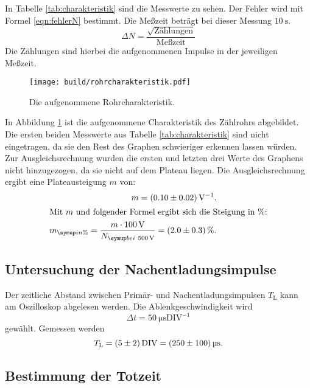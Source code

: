 In Tabelle \ref{tab:charakteristik} sind die Messwerte zu sehen. Der Fehler wird mit Formel
\eqref{eqn:fehlerN} bestimmt. Die Meßzeit beträgt bei dieser Messung $\SI{10}{\second}$.
\begin{equation}
  \Delta N = \frac{\sqrt{\text{Zählungen}}}{\text{Meßzeit}}
  \label{eqn:fehlerN}
\end{equation}
Die Zählungen sind hierbei die aufgenommenen Impulse in der jeweiligen Meßzeit.

\begin{figure}
  \centering
  \texttt{[image: build/rohrcharakteristik.pdf]}
  \caption{Die aufgenommene Rohrcharakteristik.}
  \label{fig:rohrcharakteristik}
\end{figure}

In Abbildung \ref{fig:rohrcharakteristik} ist die aufgenommene Charakteristik des Zählrohrs abgebildet.
Die ersten beiden Messwerte aus Tabelle \ref{tab:charakteristik} sind nicht eingetragen, da sie
den Rest des Graphen schwieriger erkennen lassen würden. Zur Ausgleichsrechnung wurden die ersten und
letzten drei Werte des Graphens nicht hinzugezogen, da sie nicht auf dem Plateau liegen.
Die Ausgleichsrechnung ergibt eine Plateausteigung $m$ von:
\begin{align*}
  m = \SI{0.10+-0.02}{\per\volt}.\\
  \intertext{Mit $m$ und folgender Formel ergibt sich die Steigung in $\si{\percent}$:}%
  m_{\g{in}\si{\percent}} = \frac{m \cdot \SI{100}{\volt}}{N_{\g{bei}~\SI{500}{\volt}}} = \SI{2.0+-0.3}{\percent}.
\end{align*}

\subsection{Untersuchung der Nachentladungsimpulse}
\label{sec:nachentladung}

Der zeitliche Abstand zwischen Primär- und Nachentladungsimpulsen $T_\text{L}$ kann am Oszilloskop
abgelesen werden. Die Ablenkgeschwindigkeit wird
\begin{equation*}
  \Delta t = \SI{50}{\micro\second\text{DIV}}^{-1}
\end{equation*}
gewählt.
Gemessen werden
\begin{equation*}
  T_\text{L} = \SI{5+-2}{\text{DIV}} = \SI{250+-100}{\micro\second}.
\end{equation*}

\subsection{Bestimmung der Totzeit}

